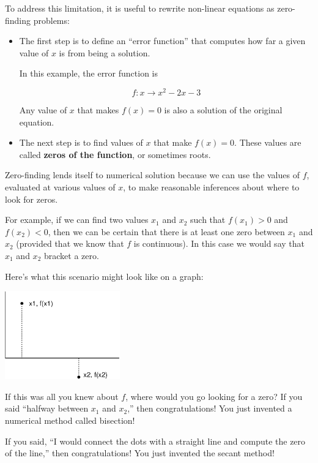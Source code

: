 \documentclass[
]{book}
\begin{document}
To address this limitation, it is useful to
rewrite non-linear equations as zero-finding problems:

\begin{itemize}

\item The first step is to define
an ``error function'' that computes how far
a given value of $x$ is from being a solution.

In this example, the error function is

\begin{equation}
f : x \to x^2 - 2x -3
\end{equation}

Any value of $x$ that makes $f(x) = 0$ is also a solution
of the original equation.

\item The next step is to find values of $x$ that make
$f(x) = 0$.  These values are called {\bf zeros of the
function}, or sometimes roots.

\end{itemize}

Zero-finding lends itself to numerical solution because we can
use the values of $f$, evaluated at various values of $x$, to
make reasonable inferences about where to look for zeros.

For example, if we can find two values $x_1$ and $x_2$ such that
$f(x_1) > 0$ and $f(x_2) < 0$, then we can be certain that there is at
least one zero between $x_1$ and $x_2$ (provided that we know that $f$
is continuous).  In this case we would say that $x_1$ and $x_2$
bracket a zero.

Here's what this scenario might look like on a graph:

\beforefig \centerline{\includegraphics[height=1.5in]{figs/secant.eps}}

If this was all you knew about $f$, where would you go looking for
a zero?  If you said ``halfway between $x_1$ and $x_2$,'' then
congratulations!  You just invented a numerical method called
bisection!

If you said, ``I would connect the dots with a straight line
and compute the zero of the line,'' then
congratulations!  You just invented the secant method!
\end{document}
